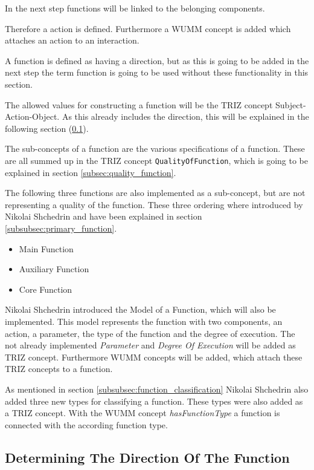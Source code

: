 \documentclass[11pt,a4paper]{article}
\begin{document}
In the next step functions will be linked to the belonging components.

Therefore a action is defined.  Furthermore a WUMM concept is added which
attaches an action to an interaction.

A function is defined as having a direction, but as this is going to be added
in the next step the term function is going to be used without these
functionality in this section.

The allowed values for constructing a function will be the TRIZ concept
Subject-Action-Object.  As this already includes the direction, this will be
explained in the following section (\ref{subsec:direction_function}).

The sub-concepts of a function are the various specifications of a function.
These are all summed up in the TRIZ concept \texttt{QualityOfFunction}, which
is going to be explained in section \ref{subsec:quality_function}.

The following three functions are also implemented as a sub-concept, but are
not representing a quality of the function.  These three ordering where
introduced by Nikolai Shchedrin and have been explained in section
\ref{subsubsec:primary_function}.

\begin{itemize}
\item Main Function
\item Auxiliary Function
\item Core Function
\end{itemize}

Nikolai Shchedrin introduced the Model of a Function, which will also be
implemented.  This model represents the function with two components, an
action, a parameter, the type of the function and the degree of execution.
The not already implemented \emph{Parameter} and \emph{Degree Of Execution}
will be added as TRIZ concept.  Furthermore WUMM concepts will be added, which
attach these TRIZ concepts to a function.

As mentioned in section \ref{subsubsec:function_classification} Nikolai
Shchedrin also added three new types for classifying a function.  These types
were also added as a TRIZ concept.  With the WUMM concept
\emph{hasFunctionType} a function is connected with the according function
type.

\subsection{Determining The Direction Of The Function}
\label{subsec:direction_function}
\end{document}
